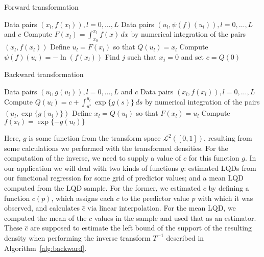\begin{algorithm}
    \caption{Forward transformation}
    \label{alg:forward}
    \begin{algorithmic}[1]
    \Require Data pairs \( (x_l, f(x_l)), l = 0, \ldots, L \)
    \Ensure Data pairs \( (u_l, \psi(f)(u_l)), l = 0, \ldots, L \) and \( c \)
        \State Compute \( F(x_l) = \int_{x_0}^{x_l} f(x) \, dx \) by numerical integration of the pairs \( (x_l, f(x_l)) \)
        \State Define \( u_l = F(x_l) \) so that \( Q(u_l) = x_l \)
        \State Compute \( \psi(f)(u_l) = -\ln(f(x_l)) \)
        \State Find \( j \) such that \( x_j = 0 \) and set \( c = Q(0) \)
    \EndFor
    \end{algorithmic}
\end{algorithm}

\begin{algorithm}
    \caption{Backward transformation}
    \label{alg:backward}
    \begin{algorithmic}[1]
    \Require Data pairs \( (u_l, g(u_l)), l = 0, \ldots, L \) and \( c \)
    \Ensure Data pairs \( (x_l, f(x_l)), l = 0, \ldots, L \)
        \State Compute \( Q(u_l) = c + \int_{u^*}^{u_l} \exp\{g(s)\} \, ds \) by numerical integration of the pairs \( (u_l, \exp\{g(u_l)\}) \)
        \State Define \( x_l = Q(u_l) \) so that \( F(x_l) = u_l \)
        \State Compute \( f(x_l) = \exp \{-g(u_l)\} \)
    \EndFor
    \end{algorithmic}
\end{algorithm}

Here, $g$ is some function from the transform space $\mathcal{L}^2([0,1])$,
resulting from some calculations we performed with the transformed densities. For
the computation of the inverse, we need to supply a value of $c$ for this function $g$.
In our application we will deal with two kinds of functions $g$: estimated LQDs from
our functional regression for some grid of predictor values; and a mean LQD computed from
the LQD sample. For the former, we estimated $c$ by defining a function $c(p)$, which
assigns each $c$ to the predictor value $p$ with which it was observed, and calculates $\hat{c}$
via linear interpolation. For the mean LQD, we computed the mean of the $c$ values in the sample
and used that as an estimator. These $\hat{c}$ are supposed to estimate the left bound
of the support of the resulting density when performing the inverse transform $T^{-1}$
described in Algorithm~\ref{alg:backward}.

